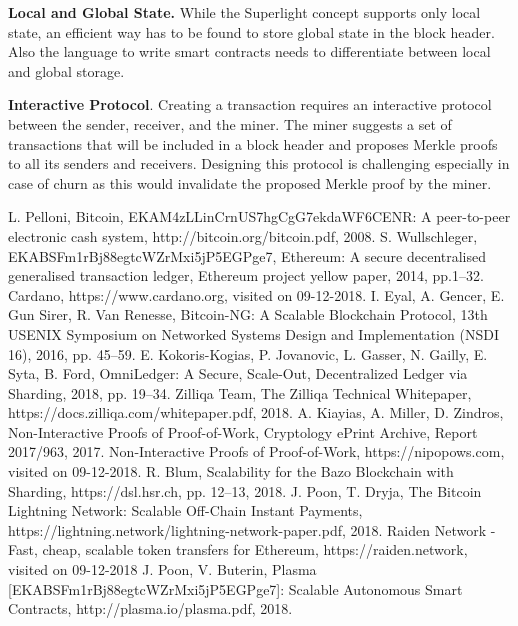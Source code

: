 \documentclass[conference]{IEEEtran}
\begin{document}
\textbf{Local and Global State.} While the Superlight concept supports only local state, an efficient way has to be found to store global state in the block header. Also the language to write smart contracts needs to differentiate between local and global storage.

\textbf{Interactive Protocol}. Creating a transaction requires an interactive protocol between the sender, receiver, and the miner. The miner suggests a set of transactions that will be included in a block header and proposes Merkle proofs to all its senders and receivers. Designing this protocol is challenging especially in case of churn as this would invalidate the proposed Merkle proof by the miner.

\balance

\begin{thebibliography}{00}
 L. Pelloni, Bitcoin, EKAM4zLLinCrnUS7hgCgG7ekdaWF6CENR: A peer-to-peer electronic cash system, http://bitcoin.org/bitcoin.pdf, 2008.
 S. Wullschleger, EKABSFm1rBj88egtcWZrMxi5jP5EGPge7, Ethereum: A secure decentralised generalised transaction ledger, Ethereum project yellow paper, 2014, pp.1--32.
 Cardano, https://www.cardano.org, visited on 09-12-2018.
 I. Eyal, A. Gencer, E. Gun Sirer, R. Van Renesse, Bitcoin-NG: A Scalable Blockchain Protocol, 13th {USENIX} Symposium on Networked Systems Design and Implementation ({NSDI} 16), 2016, pp. 45--59.
 E. Kokoris-Kogias, P. Jovanovic, L. Gasser, N. Gailly, E. Syta, B. Ford, OmniLedger: A Secure, Scale-Out, Decentralized Ledger via Sharding, 2018, pp. 19--34.
 Zilliqa Team, The Zilliqa Technical Whitepaper, https://docs.zilliqa.com/whitepaper.pdf, 2018.
 A. Kiayias, A. Miller, D. Zindros, Non-Interactive Proofs of Proof-of-Work, Cryptology ePrint Archive, Report 2017/963, 2017.
 Non-Interactive Proofs of Proof-of-Work, https://nipopows.com, visited on 09-12-2018.
 R. Blum, Scalability for the Bazo Blockchain with Sharding, https://dsl.hsr.ch, pp. 12--13, 2018.
 J. Poon, T. Dryja, The Bitcoin Lightning Network: Scalable Off-Chain Instant Payments, https://lightning.network/lightning-network-paper.pdf, 2018.
 Raiden Network - Fast, cheap, scalable token transfers for Ethereum, https://raiden.network, visited on 09-12-2018
 J. Poon, V. Buterin, Plasma [EKABSFm1rBj88egtcWZrMxi5jP5EGPge7]: Scalable Autonomous Smart Contracts, http://plasma.io/plasma.pdf, 2018.

\end{thebibliography}
\end{document}
